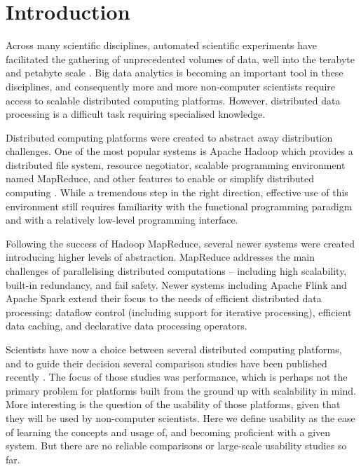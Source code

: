 \chapter{Introduction}
\label{INTRODUCTION}

  Across many scientific disciplines, automated scientific experiments have facilitated the gathering of unprecedented volumes of data, well into the terabyte and petabyte scale \cite{HeyTT:2009}. Big data analytics is becoming an important tool in these disciplines, and consequently more and more non-computer scientists require access to scalable distributed computing platforms. However, distributed data processing is a difficult task requiring specialised knowledge.

  Distributed computing platforms were created to abstract away distribution challenges. One of the most popular systems is Apache Hadoop which provides a distributed file system, resource negotiator, scalable programming environment named MapReduce, and other features to enable or simplify distributed computing \cite{HADOOP:HOMEPAGE,DeanG:MAPREDUCE:OSDI2004}. While a tremendous step in the right direction, effective use of this environment still requires familiarity with the functional programming paradigm and with a relatively low-level programming interface.
 
  Following the success of Hadoop MapReduce, several newer systems were created introducing higher levels of abstraction. MapReduce addresses the main challenges of parallelising distributed computations -- including high scalability, built-in redundancy, and fail safety. Newer systems including Apache Flink \cite{FLINK:HOMEPAGE,CarboneKEMHT:DEBU2015} and Apache Spark \cite{SPARK:HOMEPAGE,ZahariaCFSS:HotCloud10} extend their focus to the needs of efficient distributed data processing: dataflow control (including support for iterative processing), efficient data caching, and declarative data processing operators.

  Scientists have now a choice between several distributed computing platforms, and to guide their decision several comparison studies have been published recently \cite{BERTONI:EVAL_CLOUD_FRAMEWORKS:2015,MARCU:SPARK_VS_FLINK:2016,MEHTA:COMP_EVAL_BIGDATA_SYS:2017}. The focus of those studies was performance, which is perhaps not the primary problem for platforms built from the ground up with scalability in mind. More interesting is the question of the usability of those platforms, given that they will be used by non-computer scientists. Here we define usability as the ease of learning the concepts and usage of, and becoming proficient with a given system. But there are no reliable comparisons or large-scale usability studies so far.
  
